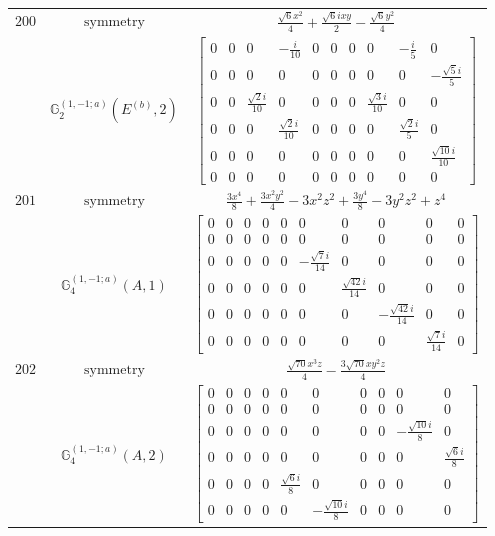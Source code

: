 \documentclass[fleqn,8pt,landscape]{jsarticle}
\begin{document}
\begin{longtable}{ccc}
$ 200 $ & $ \text{symmetry} $ & $ \frac{\sqrt{6} x^{2}}{4} + \frac{\sqrt{6} i x y}{2} - \frac{\sqrt{6} y^{2}}{4} $ \\
$  $ & $ \mathbb{G}_{2}^{(1,-1;a)}(E^{(b)},2) $ & $ \begin{bmatrix} 0 & 0 & 0 & - \frac{i}{10} & 0 & 0 & 0 & 0 & - \frac{i}{5} & 0 \\ 0 & 0 & 0 & 0 & 0 & 0 & 0 & 0 & 0 & - \frac{\sqrt{5} i}{5} \\ 0 & 0 & \frac{\sqrt{2} i}{10} & 0 & 0 & 0 & 0 & \frac{\sqrt{3} i}{10} & 0 & 0 \\ 0 & 0 & 0 & \frac{\sqrt{2} i}{10} & 0 & 0 & 0 & 0 & \frac{\sqrt{2} i}{5} & 0 \\ 0 & 0 & 0 & 0 & 0 & 0 & 0 & 0 & 0 & \frac{\sqrt{10} i}{10} \\ 0 & 0 & 0 & 0 & 0 & 0 & 0 & 0 & 0 & 0 \end{bmatrix} $ \\ \hline
$ 201 $ & $ \text{symmetry} $ & $ \frac{3 x^{4}}{8} + \frac{3 x^{2} y^{2}}{4} - 3 x^{2} z^{2} + \frac{3 y^{4}}{8} - 3 y^{2} z^{2} + z^{4} $ \\
$  $ & $ \mathbb{G}_{4}^{(1,-1;a)}(A,1) $ & $ \begin{bmatrix} 0 & 0 & 0 & 0 & 0 & 0 & 0 & 0 & 0 & 0 \\ 0 & 0 & 0 & 0 & 0 & 0 & 0 & 0 & 0 & 0 \\ 0 & 0 & 0 & 0 & 0 & - \frac{\sqrt{7} i}{14} & 0 & 0 & 0 & 0 \\ 0 & 0 & 0 & 0 & 0 & 0 & \frac{\sqrt{42} i}{14} & 0 & 0 & 0 \\ 0 & 0 & 0 & 0 & 0 & 0 & 0 & - \frac{\sqrt{42} i}{14} & 0 & 0 \\ 0 & 0 & 0 & 0 & 0 & 0 & 0 & 0 & \frac{\sqrt{7} i}{14} & 0 \end{bmatrix} $ \\ \hline
$ 202 $ & $ \text{symmetry} $ & $ \frac{\sqrt{70} x^{3} z}{4} - \frac{3 \sqrt{70} x y^{2} z}{4} $ \\
$  $ & $ \mathbb{G}_{4}^{(1,-1;a)}(A,2) $ & $ \begin{bmatrix} 0 & 0 & 0 & 0 & 0 & 0 & 0 & 0 & 0 & 0 \\ 0 & 0 & 0 & 0 & 0 & 0 & 0 & 0 & 0 & 0 \\ 0 & 0 & 0 & 0 & 0 & 0 & 0 & 0 & - \frac{\sqrt{10} i}{8} & 0 \\ 0 & 0 & 0 & 0 & 0 & 0 & 0 & 0 & 0 & \frac{\sqrt{6} i}{8} \\ 0 & 0 & 0 & 0 & \frac{\sqrt{6} i}{8} & 0 & 0 & 0 & 0 & 0 \\ 0 & 0 & 0 & 0 & 0 & - \frac{\sqrt{10} i}{8} & 0 & 0 & 0 & 0 \end{bmatrix} $ \\ \hline

\end{longtable}
\end{document}
